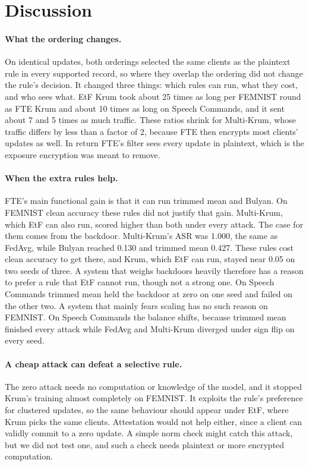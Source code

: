 \section{Discussion}
\label{sec:discussion}

\paragraph{What the ordering changes.}
On identical updates, both orderings selected the same clients as the plaintext rule in every supported record, so where they overlap the ordering did not change the rule's decision. It changed three things: which rules can run, what they cost, and who sees what. EtF Krum took about 25 times as long per FEMNIST round as FTE Krum and about 10 times as long on Speech Commands, and it sent about 7 and 5 times as much traffic. These ratios shrink for Multi-Krum, whose traffic differs by less than a factor of 2, because FTE then encrypts most clients' updates as well. In return FTE's filter sees every update in plaintext, which is the exposure encryption was meant to remove.

\paragraph{When the extra rules help.}
FTE's main functional gain is that it can run trimmed mean and Bulyan. On FEMNIST clean accuracy these rules did not justify that gain. Multi-Krum, which EtF can also run, scored higher than both under every attack. The case for them comes from the backdoor. Multi-Krum's ASR was 1.000, the same as FedAvg, while Bulyan reached 0.130 and trimmed mean 0.427. These rules cost clean accuracy to get there, and Krum, which EtF can run, stayed near 0.05 on two seeds of three. A system that weighs backdoors heavily therefore has a reason to prefer a rule that EtF cannot run, though not a strong one. On Speech Commands trimmed mean held the backdoor at zero on one seed and failed on the other two. A system that mainly fears scaling has no such reason on FEMNIST. On Speech Commands the balance shifts, because trimmed mean finished every attack while FedAvg and Multi-Krum diverged under sign flip on every seed.

\paragraph{A cheap attack can defeat a selective rule.}
The zero attack needs no computation or knowledge of the model, and it stopped Krum's training almost completely on FEMNIST. It exploits the rule's preference for clustered updates, so the same behaviour should appear under EtF, where Krum picks the same clients. Attestation would not help either, since a client can validly commit to a zero update. A simple norm check might catch this attack, but we did not test one, and such a check needs plaintext or more encrypted computation.

